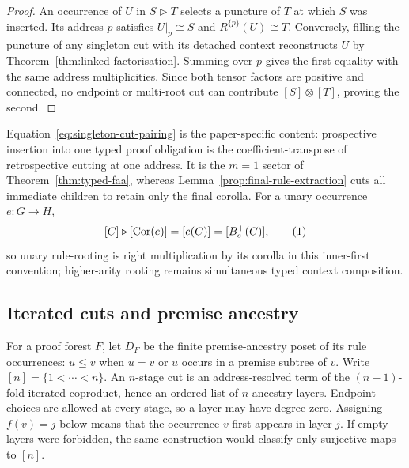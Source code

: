 \documentclass[10pt,a4paper]{article}
\theoremstyle{plain}
\theoremstyle{definition}
\theoremstyle{remark}
\newcommand{\eqtag}{\refstepcounter{equation}\tag{\theequation}}
\begin{document}
\begin{proof}
An occurrence of \(U\) in \(S\triangleright T\) selects a puncture of
\(T\) at which \(S\) was inserted.  Its address \(p\) satisfies
\(
U|_p\cong S
\)
and
\(
R^{\{p\}}(U)\cong T
\).
Conversely, filling the puncture of any singleton cut with its detached
context reconstructs \(U\) by
Theorem~\ref{thm:linked-factorisation}.  Summing over \(p\) gives the
first equality with the same address multiplicities.  Since both tensor
factors are positive and connected, no endpoint or multi-root cut can
contribute \([S]\otimes[T]\), proving the second.
\end{proof}

Equation~\eqref{eq:singleton-cut-pairing} is the paper-specific content:
prospective insertion into one typed proof obligation is the
coefficient-transpose of retrospective cutting at one address.  It is the
\(m=1\) sector of Theorem~\ref{thm:typed-faa}, whereas
Lemma~\ref{prop:final-rule-extraction} cuts all immediate children to
retain only the final corolla.  For a unary occurrence \(e:G\to H\),
\[
 [C]\triangleright[\operatorname{Cor}(e)]
    =[e(C)]=[B_e^+(C)] ,
\eqtag\label{eq:unary-rooting-prelie}
\]
so unary rule-rooting is right multiplication by its corolla in this
inner-first convention; higher-arity rooting remains simultaneous typed
context composition.

\subsection{Iterated cuts and premise ancestry}

For a proof forest \(F\), let \(D_F\) be the finite premise-ancestry
poset of its rule occurrences: \(u\le v\) when \(u=v\) or \(u\) occurs in
a premise subtree of \(v\).  Write \([n]=\{1<\cdots<n\}\).  An
\(n\)-stage cut is an address-resolved term of the
\((n-1)\)-fold iterated coproduct, hence an ordered list of \(n\) ancestry
layers.  Endpoint choices are allowed at every stage, so a layer may have
degree zero.  Assigning \(f(v)=j\) below means that the occurrence \(v\)
first appears in layer \(j\).  If empty layers were forbidden, the same
construction would classify only surjective maps to \([n]\).
\end{document}
